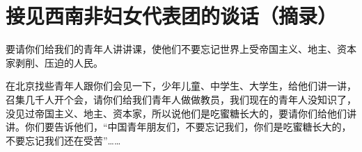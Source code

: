 \section[接见西南非妇女代表团的谈话（摘录）（一九六四年十月）]{接见西南非妇女代表团的谈话（摘录）}


要请你们给我们的青年人讲讲课，使他们不要忘记世界上受帝国主义、地主、资本家剥削、压迫的人民。

在北京找些青年人跟你们会见一下，少年儿童、中学生、大学生，给他们讲一讲，召集几千人开个会，请你们给我们青年人做做教员，我们现在的青年人没知识了，没见过帝国主义、地主、资本家，所以说他们是吃蜜糖长大的，要请你们给他们讲讲。你们要告诉他们，“中国青年朋友们，不要忘记我们，你们是吃蜜糖长大的，不要忘记我们还在受苦”……

